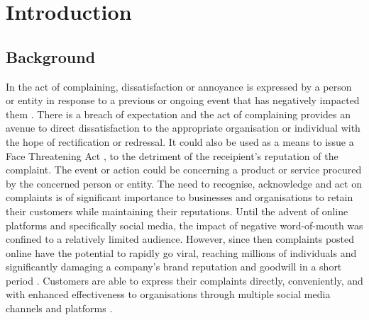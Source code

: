 \chapter{Introduction}

\section{Background}
In the act of complaining, dissatisfaction or annoyance is expressed by a person or entity in response to a previous or ongoing event that has negatively impacted them \cite{olshtain_speechact_1987}. There is a breach of expectation and the act of complaining provides an avenue to direct dissatisfaction to the appropriate organisation or individual with the hope of rectification or redressal. It could also be used as a means to issue a Face Threatening Act \cite{brownPolitenessUniversalsLanguage1987}, to the detriment of the receipient's reputation of the complaint. The event or action could be concerning a product or service procured by the concerned person or entity. The need to recognise, acknowledge and act on complaints is of significant importance to businesses and organisations to retain their customers while maintaining their reputations.
\newline \newline
Until the advent of online platforms and specifically social media, the impact of negative word-of-mouth was confined to a relatively limited audience. However, since then complaints posted online have the potential to rapidly go viral, reaching millions of individuals and significantly damaging a company's brand reputation and goodwill in a short period \cite{tripp_when_2011}. Customers are able to express their complaints directly, conveniently, and with enhanced effectiveness to organisations through multiple social media channels and platforms \cite{balaji_customer_2015}.\newline

